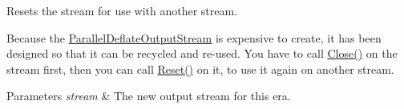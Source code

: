 Resets the stream for use with another stream. 

Because the \mbox{\hyperlink{class_super_tiled2_unity_1_1_ionic_1_1_zlib_1_1_parallel_deflate_output_stream}{Parallel\+Deflate\+Output\+Stream}} is expensive to create, it has been designed so that it can be recycled and re-\/used. You have to call \mbox{\hyperlink{class_super_tiled2_unity_1_1_ionic_1_1_zlib_1_1_parallel_deflate_output_stream_acb96b7dec375cba963d058ea1d344f64}{Close()}} on the stream first, then you can call \mbox{\hyperlink{class_super_tiled2_unity_1_1_ionic_1_1_zlib_1_1_parallel_deflate_output_stream_a876089be11e38c6842216cc2aefd3110}{Reset()}} on it, to use it again on another stream. 


\begin{DoxyParams}{Parameters}
{\em stream} & The new output stream for this era. \\
\hline
\end{DoxyParams}



